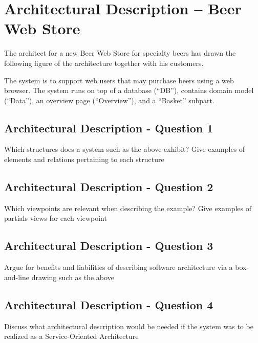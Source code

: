 \section{Architectural Description -- Beer Web Store}

The architect for a new Beer Web Store for specialty beers has drawn
the following figure of the architecture together with his customers.
\begin{figure}[h!]
  \centerline{}
\end{figure}
The system is to support web users that may purchase beers using a web
browser. The system runs on top of a database (``DB''), contains
domain model (``Data''), an overview page (``Overview''), and a
``Basket'' subpart.

\subsection{Architectural Description - Question 1}

\begin{question}
Which structures does a system such as the above exhibit?
Give examples of elements and relations pertaining to each
structure
\end{question}


\subsection{Architectural Description - Question 2}

\begin{question}
Which viewpoints are relevant when describing the example?
Give examples of partials views for each viewpoint
\end{question}


\subsection{Architectural Description - Question 3}

\begin{question}
Argue for benefits and liabilities of describing software
architecture via a box-and-line drawing such as the above
\end{question}


\subsection{Architectural Description - Question 4}

\begin{question}
Discuss what architectural description would be needed if
the system was to be realized as a Service-Oriented Architecture
\end{question}

